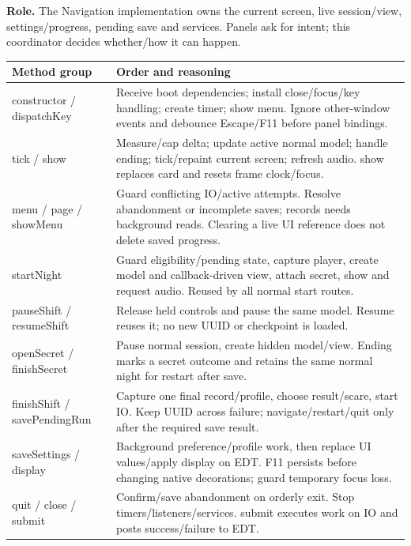 \documentclass[11pt,a4paper]{article}
\begin{document}
\label{file:Application}
\textbf{Role.} The Navigation implementation owns the current screen, live session/view, settings/progress, pending save and services. Panels ask for intent; this coordinator decides whether/how it can happen.
\par\noindent\begin{tabularx}{\linewidth}{L{.28\linewidth}X}\toprule\textbf{Method group}&\textbf{Order and reasoning}\\\midrule
constructor / dispatchKey&Receive boot dependencies; install close/focus/key handling; create timer; show menu. Ignore other-window events and debounce Escape/F11 before panel bindings.\\
tick / show&Measure/cap delta; update active normal model; handle ending; tick/repaint current screen; refresh audio. show replaces card and resets frame clock/focus.\\
menu / page / showMenu&Guard conflicting IO/active attempts. Resolve abandonment or incomplete saves; records needs background reads. Clearing a live UI reference does not delete saved progress.\\
startNight&Guard eligibility/pending state, capture player, create model and callback-driven view, attach secret, show and request audio. Reused by all normal start routes.\\
pauseShift / resumeShift&Release held controls and pause the same model. Resume reuses it; no new UUID or checkpoint is loaded.\\
openSecret / finishSecret&Pause normal session, create hidden model/view. Ending marks a secret outcome and retains the same normal night for restart after save.\\
finishShift / savePendingRun&Capture one final record/profile, choose result/scare, start IO. Keep UUID across failure; navigate/restart/quit only after the required save result.\\
saveSettings / display&Background preference/profile work, then replace UI values/apply display on EDT. F11 persists before changing native decorations; guard temporary focus loss.\\
quit / close / submit&Confirm/save abandonment on orderly exit. Stop timers/listeners/services. submit executes work on IO and posts success/failure to EDT.\\\bottomrule\end{tabularx}\par
\end{document}
